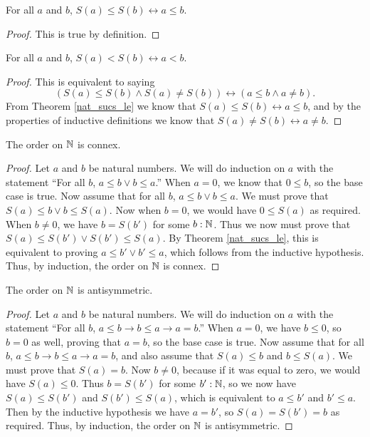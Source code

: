 \documentclass[../../math.tex]{subfiles}
\begin{document}
\begin{theorem} \label{nat_sucs_le}
    For all $a$ and $b$, $S(a) \leq S(b) \leftrightarrow a \leq b$.
\end{theorem}
\begin{proof}
    This is true by definition.
\end{proof}

\begin{theorem} \label{nat_sucs_lt}
    For all $a$ and $b$, $S(a) < S(b) \leftrightarrow a < b$.
\end{theorem}
\begin{proof}
    This is equivalent to saying
    \[
        (S(a) \leq S(b) \wedge S(a) \neq S(b)) \leftrightarrow
        (a \leq b \wedge a \neq b).
    \]
    From Theorem \ref{nat_sucs_le} we know that $S(a) \leq S(b) \leftrightarrow
    a \leq b$, and by the properties of inductive definitions we know that $S(a)
    \neq S(b) \leftrightarrow a \neq b$.
\end{proof}

\begin{instance}
    The order on $\mathbb{N}$ is connex.
\end{instance}
\begin{proof}
    Let $a$ and $b$ be natural numbers.  We will do induction on $a$ with the
    statement ``For all $b$, $a \leq b \vee b \leq a$.''  When $a = 0$, we know
    that $0 \leq b$, so the base case is true.  Now assume that for all $b$, $a
    \leq b \vee b \leq a$.  We must prove that $S(a) \leq b \vee b \leq S(a)$.
    Now when $b = 0$, we would have $0 \leq S(a)$ as required.  When $b \neq 0$,
    we have $b = S(b')$ for some $b : \mathbb{N}$.  Thus we now must prove that $S(a)
    \leq S(b') \vee S(b') \leq S(a)$.  By Theorem \ref{nat_sucs_le}, this is
    equivalent to proving $a \leq b' \vee b' \leq a$, which follows from the
    inductive hypothesis.  Thus, by induction, the order on $\mathbb{N}$ is connex.
\end{proof}

\begin{instance}
    The order on $\mathbb{N}$ is antisymmetric.
\end{instance}
\begin{proof}
    Let $a$ and $b$ be natural numbers.  We will do induction on $a$ with the
    statement ``For all $b$, $a \leq b \rightarrow b \leq a \rightarrow a =
    b$.''  When $a = 0$, we have $b \leq 0$, so $b = 0$ as well, proving that $a
    = b$, so the base case is true.  Now assume that for all $b$, $a \leq b
    \rightarrow b \leq a \rightarrow a = b$, and also assume that $S(a) \leq b$
    and $b \leq S(a)$.  We must prove that $S(a) = b$.  Now $b \neq 0$, because
    if it was equal to zero, we would have $S(a) \leq 0$.  Thus $b = S(b')$ for
    some $b' : \mathbb{N}$, so we now have $S(a) \leq S(b')$ and $S(b') \leq S(a)$,
    which is equivalent to $a \leq b'$ and $b' \leq a$.  Then by the inductive
    hypothesis we have $a = b'$, so $S(a) = S(b') = b$ as required.  Thus, by
    induction, the order on $\mathbb{N}$ is antisymmetric.
\end{proof}
\end{document}
